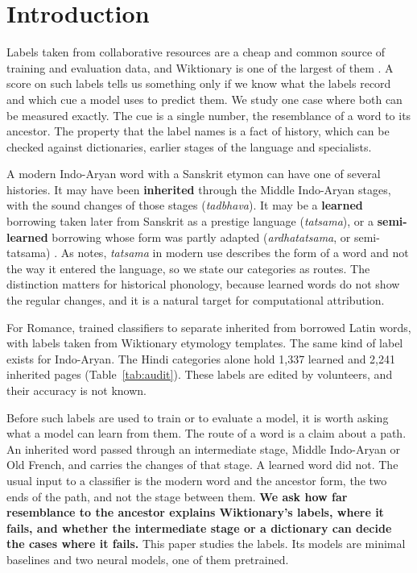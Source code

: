 \documentclass[11pt]{article}
\begin{document}
\section{Introduction}

Labels taken from collaborative resources are a cheap and common source of training and evaluation data, and Wiktionary is one of the largest of them \citep{wu2020computational}. A score on such labels tells us something only if we know what the labels record and which cue a model uses to predict them. We study one case where both can be measured exactly. The cue is a single number, the resemblance of a word to its ancestor. The property that the label names is a fact of history, which can be checked against dictionaries, earlier stages of the language and specialists.

A modern Indo-Aryan word with a Sanskrit etymon can have one of several histories. It may have been \textbf{inherited} through the Middle Indo-Aryan stages, with the sound changes of those stages (\textit{tadbhava}). It may be a \textbf{learned} borrowing taken later from Sanskrit as a prestige language (\textit{tatsama}), or a \textbf{semi-learned} borrowing whose form was partly adapted (\textit{ardhatatsama}, or semi-tatsama) \citep[\S111]{chatterji1926}. As \citeauthor{chatterji1926} notes, \textit{tatsama} in modern use describes the form of a word and not the way it entered the language, so we state our categories as routes. The distinction matters for historical phonology, because learned words do not show the regular changes, and it is a natural target for computational attribution.

For Romance, \citet{cristea2021inherited} trained classifiers to separate inherited from borrowed Latin words, with labels taken from Wiktionary etymology templates. The same kind of label exists for Indo-Aryan. The Hindi categories alone hold 1,337 learned and 2,241 inherited pages (Table~\ref{tab:audit}). These labels are edited by volunteers, and their accuracy is not known.

Before such labels are used to train or to evaluate a model, it is worth asking what a model can learn from them. The route of a word is a claim about a path. An inherited word passed through an intermediate stage, Middle Indo-Aryan or Old French, and carries the changes of that stage. A learned word did not. The usual input to a classifier is the modern word and the ancestor form, the two ends of the path, and not the stage between them. \textbf{We ask how far resemblance to the ancestor explains Wiktionary's labels, where it fails, and whether the intermediate stage or a dictionary can decide the cases where it fails.} This paper studies the labels. Its models are minimal baselines and two neural models, one of them pretrained.
\end{document}
